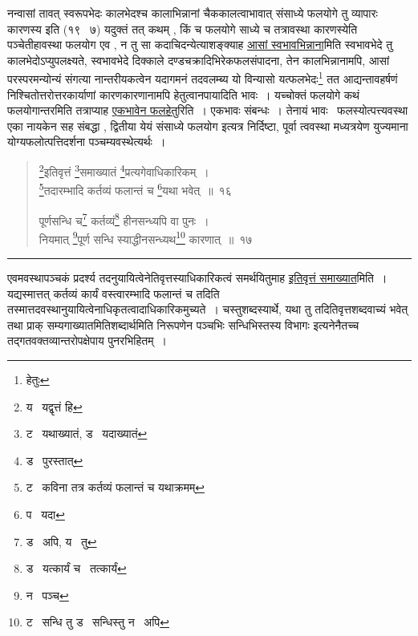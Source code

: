 \documentclass[11pt, openany]{book}
\begin{document}
नन्वासां तावत् स्वरूपभेदः कालभेदश्च कालाभिन्नानां चैककालत्वाभावात् {\qt संसाध्ये फलयोगे तु व्यापारः कारणस्य } इति (१९ \textendash\ ७) यदुक्तं तत् कथम् , किं च फलयोगे साध्ये च तत्रावस्था कारणस्येति पञ्चेतीहावस्था फलयोग एव , न तु सा कदाचिदन्येत्याशङ्क्याह \underline{आसां स्वभावभिन्नाना}मिति स्वभावभेदे तु कालभेदोऽप्युपलक्ष्यते, स्वभावभेदे दिक्काले दण्डचक्रादिभिरेकफलसंपादना, तेन कालभिन्नानामपि, आसां परस्परमन्योन्यं संगत्या नान्तरीयकत्वेन यदागमनं तदवलम्ब्य यो विन्यासो यत्फलभेदः\renewcommand{\thefootnote}{4}\footnote{हेतुः} तत आद्यन्तावहर्षणं निश्चितोत्तरोत्तरकार्याणां कारणकारणानामपि हेतुत्वानपायादिति भावः~। यच्चोक्तं फलयोगे कथं फलयोगान्तरमिति तत्राप्याह \underline{एकभावेन फलहेतु}रिति~। एकभावः संबन्धः~। तेनायं भावः \textendash\ फलस्योत्पत्त्यवस्था एका नायकेन सह संबद्धा , द्वितीया येयं संसाध्ये फलयोग इत्यत्र निर्दिष्टा, पूर्वा त्ववस्था मध्यत्रयेण युज्यमाना योग्यफलोत्पत्तिदर्शना पञ्चम्यवस्थेत्यर्थः~।


\newpage
\lfoot{}

\begin{quote}
{\na \renewcommand{\thefootnote}{1}\footnote{य \textendash\ यद्वृत्तं हि}इतिवृत्तं \renewcommand{\thefootnote}{2}\footnote{ट \textendash\ यथाख्यातं, ड \textendash\ यदाख्यातं}समाख्यातं \renewcommand{\thefootnote}{3}\footnote{ड \textendash\ पुरस्तात्}प्रत्यगेवाधिकारिकम्~।\\
\renewcommand{\thefootnote}{4}\footnote{ट \textendash\ कविना तत्र कर्तव्यं फलान्तं च यथाक्रमम्}तदारम्भादि कर्तव्यं फलान्तं च \renewcommand{\thefootnote}{5}\footnote{प \textendash\ यदा}यथा भवेत्~॥~१६

पूर्णसन्धि च\renewcommand{\thefootnote}{6}\footnote{ड \textendash\ अपि, य \textendash\ तु} कर्तव्यं\renewcommand{\thefootnote}{7}\footnote{ड \textendash\ यत्कार्यं च \textendash\ तत्कार्यं} हीनसन्ध्यपि वा पुनः~।\\
नियमात् \renewcommand{\thefootnote}{8}\footnote{न \textendash\ पञ्च}पूर्ण सन्धि स्याद्धीनसन्ध्यथ\renewcommand{\thefootnote}{9}\footnote{ट \textendash\ सन्धि तु ड \textendash\ सन्धिस्तु न \textendash\ अपि} कारणात्~॥~१७}
\end{quote}

\hrule

\vspace{2mm}
एवमवस्थापञ्चकं प्रदर्श्य तदनुयायित्वेनेतिवृत्तस्याधिकारिकत्वं समर्थयितुमाह \underline{इतिवृत्तं समाख्यात}मिति~। यद्यस्मात्तत् कर्तव्यं कार्यं वस्त्वारम्भादि फलान्तं च तदिति तस्मात्तदवस्थानुयायित्वेनाधिकृतत्वादाधिकारिकमुच्यते~। चस्तुशब्दस्यार्थे, यथा तु तदितिवृत्तशब्दवाच्यं भवेत् तथा प्राक् सम्यगाख्यातमितिशब्दार्थमिति निरूपणेन {\qt पञ्चभिः सन्धिभिस्तस्य विभागः} इत्यनेनैतच्च तद्गतवक्तव्यान्तरोपक्षेपाय पुनरभिहितम्~।\\
\end{document}
